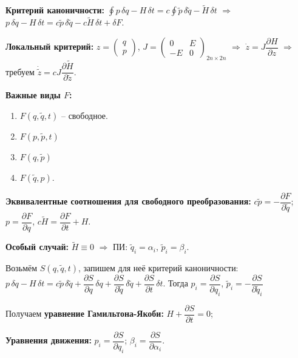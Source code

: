 \documentclass[12pt, a4paper]{article}
\theoremstyle{plain}
\theoremstyle{definition}
\theoremstyle{remark}
\begin{document}
\textbf{Критерий каноничности:} $\oint p\,\delta q - H\,\delta t = c \oint \tilde{p}\,\delta\tilde{q} - \tilde{H}\,\delta t$ $\Rightarrow$ $p\,\delta q - H\,\delta t = c\tilde{p}\,\delta\tilde{q} - c\tilde{H}\,\delta t + \delta F$.

\textbf{Локальный критерий:} $z = \begin{pmatrix} q \\ p \end{pmatrix}$, $J = \begin{pmatrix} 0 & E \\ -E & 0 \end{pmatrix}_{2n \times 2n}$ $\Rightarrow$ $\dot{z} = J \dfrac{\partial H}{\partial z}$ $\Rightarrow$ требуем $\dot{\tilde{z}} = cJ \dfrac{\partial \tilde{H}}{\partial \tilde{z}}$.

\textbf{Важные виды $F$:}
\begin{enumerate}
    \item $F(q, \tilde{q}, t)$ -- свободное.
    \item $F(p, \tilde{p}, t)$
    \item $F(q, \tilde{p})$ 
    \item $F(\tilde{q}, p)$.
\end{enumerate}

\textbf{Эквивалентные соотношения для свободного преобразования:} $c\tilde{p} = -\dfrac{\partial F}{\partial \tilde{q}}$; $p = \dfrac{\partial F}{\partial q}$, $c\tilde{H} = \dfrac{\partial F}{\partial t} + H$.

\textbf{Особый случай:} $\tilde{H} \equiv 0$ $\Rightarrow$ ПИ: $\tilde{q}_i = \alpha_i$, $\tilde{p}_i = \beta_i$.

Возьмём $S(q, \tilde{q}, t)$, запишем для неё критерий каноничности: $p\,\delta q - H\,\delta t = c\tilde{p}\,\delta\tilde{q} + \dfrac{\partial S}{\partial q}\,\delta q + \dfrac{\partial S}{\partial \tilde{q}}\,\delta\tilde{q} + \dfrac{\partial S}{\partial t}\,\delta t$. Тогда $p_i = \dfrac{\partial S}{\partial q_i}$, $\tilde{p}_i = -\dfrac{\partial S}{\partial \tilde{q}_i}$

Получаем \textbf{уравнение Гамильтона-Якоби:} $H + \dfrac{\partial S}{\partial t} = 0$; 

\textbf{Уравнения движения:} $p_i = \dfrac{\partial S}{\partial q_i}$; $\beta_i = \dfrac{\partial S}{\partial \alpha_i}$.
\end{document}
